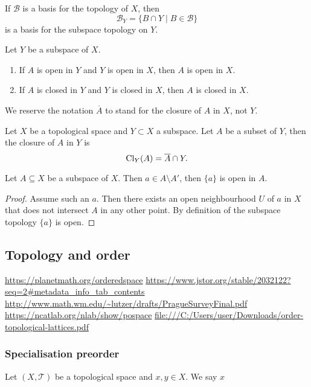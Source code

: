 \begin{lemma}
If $\mathcal{B}$ is a basis for the topology of $X$, then
\[\mathcal{B}_Y = \{ B\cap Y \;|\; B\in \mathcal{B} \}\]
is a basis for the subspace topology on $Y$.
\end{lemma}

\begin{lemma}
Let $Y$ be a subspace of $X$.
\begin{enumerate}
\item If $A$ is open in $Y$ and $Y$ is open in $X$, then $A$ is open in $X$.
\item If $A$ is closed in $Y$ and $Y$ is closed in $X$, then $A$ is closed in $X$.
\end{enumerate}
\end{lemma}
 
We reserve the notation $\overline{A}$ to stand for the closure of $A$ in $X$, not $Y$.
\begin{lemma} \label{subspaceClosure}
Let $X$ be a topological space and $Y\subset X$ a subspace. Let $A$ be a subset of $Y$, then the closure of $A$ in $Y$ is
\[ \operatorname{Cl}_Y(A) = \overline{A}\cap Y.  \]
\end{lemma}

\begin{lemma} \label{notLimitPointSingletonOpen}
Let $A\subseteq X$ be a subspace of $X$. Then $a\in A\setminus A'$, then $\{a\}$ is open in $A$.
\end{lemma}
\begin{proof}
Assume such an $a$. Then there exists an open neighbourhood $U$ of $a$ in $X$ that does not intersect $A$ in any other point. By definition of the subspace topology $\{a\}$ is open.
\end{proof}

\subsection{Topology and order}


\url{https://planetmath.org/orderedspace}
\url{https://www.jstor.org/stable/2032122?seq=2#metadata_info_tab_contents}
\url{http://www.math.wm.edu/~lutzer/drafts/PragueSurveyFinal.pdf}
\url{https://ncatlab.org/nlab/show/pospace}
\url{file:///C:/Users/user/Downloads/order-topological-lattices.pdf}

\subsubsection{Specialisation preorder}
\begin{definition}
Let $(X,\mathcal{T})$ be a topological space and $x,y\in X$. We say $x$
\end{definition}

